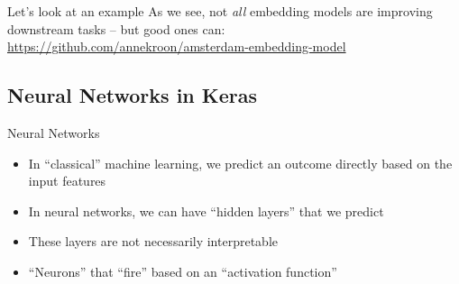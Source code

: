 \begin{frame}{Let's look at an example}
	As we see, not \emph{all} embedding models are improving downstream tasks -- but good ones can:
	\url{https://github.com/annekroon/amsterdam-embedding-model}
	
\end{frame}

\begin{frame}[plain]
\end{frame}



\subsection[Neural networks]{Neural Networks in Keras}




\begin{frame}{Neural Networks}
	\begin{itemize}
		\item In ``classical'' machine learning, we predict an outcome directly based on the input features
		\item In neural networks, we can have ``hidden layers'' that we predict
		\item These layers are not necessarily interpretable
		\item ``Neurons'' that ``fire'' based on an ``activation function''
	\end{itemize}
	
\end{frame}

